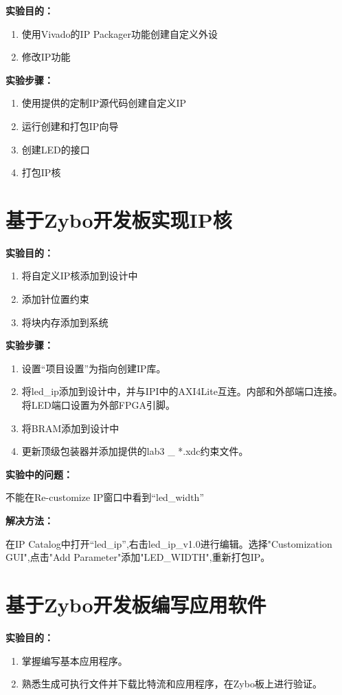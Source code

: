 \documentclass{itecreport-zh}
\begin{document}
\textbf{实验目的：}

\begin{enumerate}
  \item 使用Vivado的IP Packager功能创建自定义外设
  \item 修改IP功能
\end{enumerate}

\textbf{实验步骤：}

\begin{enumerate}
  \item 使用提供的定制IP源代码创建自定义IP
  \item 运行创建和打包IP向导
  \item 创建LED的接口
  \item 打包IP核
\end{enumerate}

\section{基于Zybo开发板实现IP核}

\textbf{实验目的：}
\begin{enumerate}
  \item 将自定义IP核添加到设计中
  \item 添加针位置约束
  \item 将块内存添加到系统
\end{enumerate}

\textbf{实验步骤：}
\begin{enumerate}
  \item 设置“项目设置”为指向创建IP库。
  \item 将led\_ip添加到设计中，并与IPI中的AXI4Lite互连。内部和外部端口连接。将LED端口设置为外部FPGA引脚。
  \item 将BRAM添加到设计中
  \item 更新顶级包装器并添加提供的lab3 \_ *.xdc约束文件。
\end{enumerate}
\textbf{实验中的问题：}


不能在Re-customize IP窗口中看到“led\_width”


\textbf{解决方法：}


在IP Catalog中打开“led\_ip”,右击led\_ip\_v1.0进行编辑。选择"Customization GUI",点击"Add Parameter"添加"LED\_WIDTH",重新打包IP。
\section{基于Zybo开发板编写应用软件}

\textbf{实验目的：}
\begin{enumerate}
  \item 掌握编写基本应用程序。
  \item 熟悉生成可执行文件并下载比特流和应用程序，在Zybo板上进行验证。
\end{enumerate}
\end{document}
